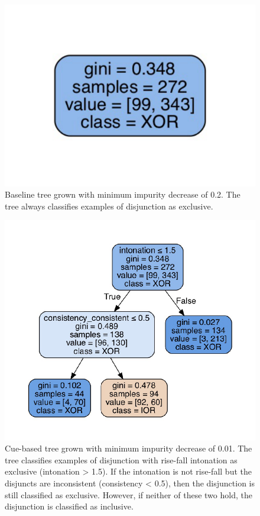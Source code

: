 \documentclass[floatsintext,man]{apa6}
\theoremstyle{definition}
\theoremstyle{definition}
\theoremstyle{definition}
\theoremstyle{remark}
\begin{document}
\begin{figure}
\centering
\includegraphics{figs/binaryBaseline-1.pdf}
\caption{\label{fig:binaryBaseline}Baseline tree grown with minimum impurity
decrease of 0.2. The tree always classifies examples of disjunction as
exclusive.}
\end{figure}

\begin{figure}
\centering
\includegraphics{figs/binaryCueBased-1.pdf}
\caption{\label{fig:binaryCueBased}Cue-based tree grown with minimum
impurity decrease of 0.01. The tree classifies examples of disjunction
with rise-fall intonation as exclusive (intonation \textgreater{} 1.5).
If the intonation is not rise-fall but the disjuncts are inconsistent
(consistency \textless{} 0.5), then the disjunction is still classified
as exclusive. However, if neither of these two hold, the disjunction is
classified as inclusive.}
\end{figure}
\end{document}
